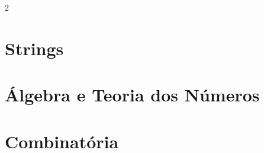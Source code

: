 \documentclass{article}
\begin{document}
\begin{multicols}{2}












\clearpage

\section{Strings}



















\clearpage

\section{Álgebra e Teoria dos Números}































\clearpage

\section{Combinatória}


\end{multicols}
\end{document}
